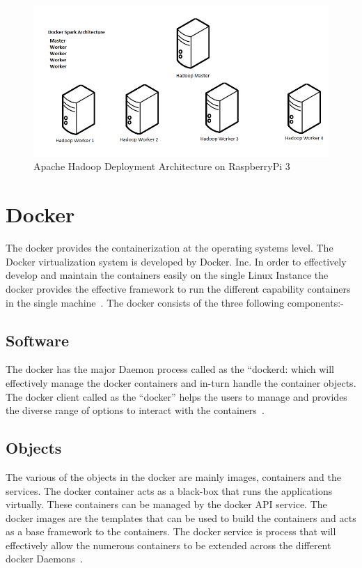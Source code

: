 \begin{figure}[!ht]
\centering\includegraphics[width=\textwidth]{images/RaspberryPiSpark.png}
\caption{Apache Hadoop Deployment Architecture on 
RaspberryPi 3}\label{s:archihadoop}
\end{figure}

\section{Docker}
The docker provides the containerization at the operating systems level. 
The Docker virtualization system is developed by Docker. Inc. 
In order to effectively develop and maintain the containers easily
 on the single Linux Instance the docker provides the effective
 framework to run the different capability
 containers in the single machine~\cite{hid-sp18-412-docker_wikepedia}. 
The docker consists of the three following components:-

\subsection{Software}
The docker has the major Daemon process called as the “dockerd: 
which will effectively manage the docker containers and in-turn 
handle the container objects. The docker client called as the “docker”
 helps the users to manage and provides the diverse range of options
 to interact with the containers~\cite{hid-sp18-412-docker_wikepedia}. 

\subsection{Objects}
The various of the objects in the docker are mainly images,
 containers and the services. 
The docker container acts as a black-box that runs 
the applications virtually. These containers can be managed by 
the docker API service. The docker images are the templates 
that can be used to build the containers and acts as a base
 framework to the containers. The docker service is process
 that will effectively allow the numerous containers to be
 extended across the 
different docker Daemons~\cite{hid-sp18-412-docker_wikepedia}. 

